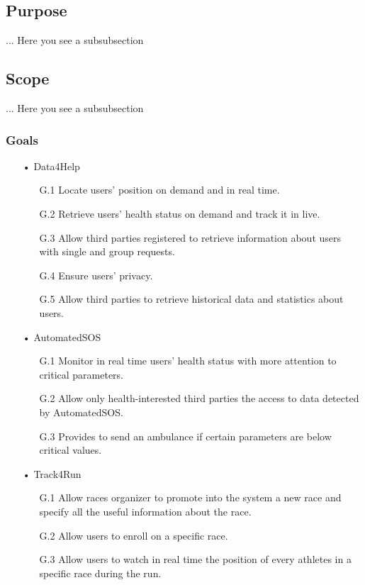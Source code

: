 \subsection{Purpose}
... Here you see a subsubsection
\subsection{Scope}
... Here you see a subsubsection
\subsubsection{Goals}

\begin{enumerate}
\item[•] {\Large Data4Help}
	\begin{enumerate}
		\item [G.1] Locate users' position on demand and in real time.
		\item [G.2] Retrieve users’ health status on demand and track it in live.
		\item [G.3] Allow third parties registered to retrieve information about users with 				single and group requests.
		\item [G.4] Ensure users' privacy.
		\item [G.5] Allow third parties to retrieve historical data and statistics about 				users.
	\end{enumerate}
	
\item[•] {\Large AutomatedSOS}
	\begin{enumerate}
		\item [G.1] Monitor in real time users’ health status with more attention to 					critical parameters.
		\item [G.2] Allow only health-interested third parties the access to data detected 				by AutomatedSOS.
		\item [G.3] Provides to send an ambulance if certain parameters are below critical 				values.
	\end{enumerate}
	
\item[•] {\Large Track4Run}	
	\begin{enumerate}
		\item [G.1] Allow races organizer to promote into the system a new race and specify 			all the useful information about the race.
		\item [G.2] Allow users to enroll on a specific race.
		\item [G.3] Allow users to watch in real time the position of every athletes in a 				specific race during the run.
	\end{enumerate}
\end{enumerate}

